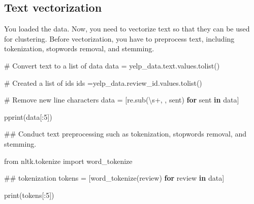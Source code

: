 \documentclass[
  letterpaper,
]{scrbook}
\newenvironment{Shaded}{\begin{snugshade}}{\end{snugshade}}
\newcommand{\BuiltInTok}[1]{\textcolor[rgb]{0.00,0.23,0.31}{#1}}
\newcommand{\CommentTok}[1]{\textcolor[rgb]{0.37,0.37,0.37}{#1}}
\newcommand{\ControlFlowTok}[1]{\textcolor[rgb]{0.00,0.23,0.31}{\textbf{#1}}}
\newcommand{\DecValTok}[1]{\textcolor[rgb]{0.68,0.00,0.00}{#1}}
\newcommand{\ErrorTok}[1]{\textcolor[rgb]{0.68,0.00,0.00}{#1}}
\newcommand{\ImportTok}[1]{\textcolor[rgb]{0.00,0.46,0.62}{#1}}
\newcommand{\KeywordTok}[1]{\textcolor[rgb]{0.00,0.23,0.31}{\textbf{#1}}}
\newcommand{\NormalTok}[1]{\textcolor[rgb]{0.00,0.23,0.31}{#1}}
\newcommand{\OperatorTok}[1]{\textcolor[rgb]{0.37,0.37,0.37}{#1}}
\newcommand{\StringTok}[1]{\textcolor[rgb]{0.13,0.47,0.30}{#1}}
\begin{document}
\subsection*{Text vectorization}\label{text-vectorization-1}

You loaded the data. Now, you need to vectorize text so that they can be
used for clustering. Before vectorization, you have to preprocess text,
including tokenization, stopwords removal, and stemming.

\begin{Shaded}
\begin{Highlighting}[]
\CommentTok{\# Convert text to a list of data}
\NormalTok{data }\OperatorTok{=}\NormalTok{ yelp\_data.text.values.tolist()}

\CommentTok{\# Created a list of ids}
\NormalTok{ids }\OperatorTok{=}\NormalTok{yelp\_data.review\_id.values.tolist()}

\CommentTok{\# Remove new line characters}
\NormalTok{data }\OperatorTok{=}\NormalTok{ [re.sub(}\StringTok{\textquotesingle{}}\ErrorTok{\textbackslash{}}\StringTok{s+\textquotesingle{}}\NormalTok{, }\StringTok{\textquotesingle{} \textquotesingle{}}\NormalTok{, sent) }\ControlFlowTok{for}\NormalTok{ sent }\KeywordTok{in}\NormalTok{ data]}

\NormalTok{pprint(data[:}\DecValTok{5}\NormalTok{])}
\end{Highlighting}
\end{Shaded}

\begin{Shaded}
\begin{Highlighting}[]
\CommentTok{\#\# Conduct text preprocessing such as tokenization, stopwords removal, and stemming.}

\ImportTok{from}\NormalTok{ nltk.tokenize }\ImportTok{import}\NormalTok{ word\_tokenize}

\CommentTok{\#\# tokenization}
\NormalTok{tokens }\OperatorTok{=}\NormalTok{ [word\_tokenize(review) }\ControlFlowTok{for}\NormalTok{ review }\KeywordTok{in}\NormalTok{ data]}

\BuiltInTok{print}\NormalTok{(tokens[:}\DecValTok{5}\NormalTok{])}
\end{Highlighting}
\end{Shaded}
\end{document}
